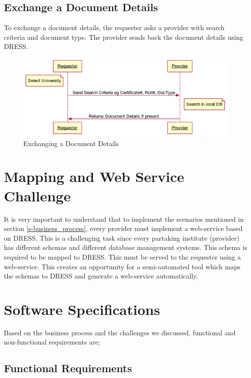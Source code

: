 \documentclass[12pt,a4paper,oneside]{book}
\begin{document}
    \subsection{Exchange a Document Details}
    To exchange a document details, the requester asks a provider with search criteria and document type. The provider sends back the document details using DRESS.

\begin{figure}[!htp]
  \centering
  \includegraphics[width=14cm]{sq_exchange_doc.png}
  \caption{Exchanging a Document Details}
  \label{fig:sq_exchange_doc}
\end{figure}

\section{Mapping and Web Service Challenge}

It is very important to understand that to implement the scenarios mentioned in section \ref{s-business_process}, every provider must implement a web-service based on DRESS. This is a challenging task since every partaking institute (provider) has different schemas and different database management systems. This schema is required to be mapped to DRESS. This must be served to the requester using a web-service. This creates an opportunity for a semi-automated tool which maps the schemas to DRESS and generate a web-service automatically.

\section{Software Specifications}\label{s-softspecs}
Based on the business process and the challenges we discussed, functional and non-functional requirements are;

    \subsection{Functional Requirements}
    
\end{document}
